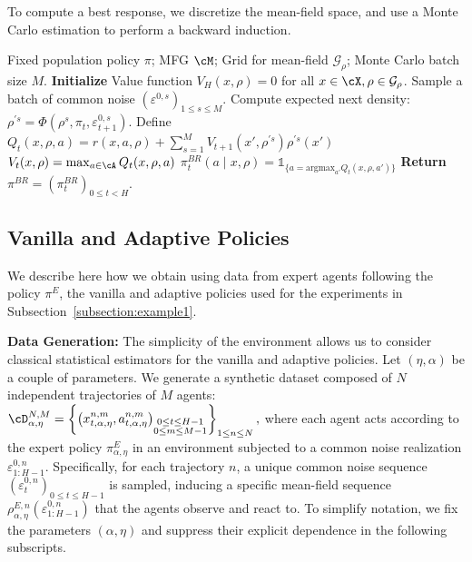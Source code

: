 \documentclass{article}
\theoremstyle{plain}
\begin{document}
To compute a best response, we discretize the mean-field space, and use a Monte Carlo estimation to perform a backward induction. 

\begin{algorithm}[ht]
\caption{Backward Induction for Best Response.}
\begin{algorithmic}[1]
\label{algo:best_response_dp}
\REQUIRE Fixed population policy $\pi$; MFG $\cM$; Grid for mean-field $\mathcal{G}_{\rho}$; Monte Carlo batch size $M$.
\STATE \textbf{Initialize} Value function $V_H(x, \rho) = 0$ for all $x \in \cX, \rho \in \mathcal{G}_{\rho}$.
                \STATE Sample a batch of common noise $(\varepsilon^{0, s})_{1\leq s\leq M}$.
                    \STATE Compute expected next density: $\rho^{'s} = \Phi(\rho^s, \pi_t, \varepsilon^{0,s}_{t+1})$.
                \ENDFOR
                \STATE Define $Q_t(x, \rho, a) = r(x, a, \rho) + \sum_{s = 1}^M  V_{t+1}(x', \rho^{'s})\rho^{'s}(x')$
            \ENDFOR
            \STATE $V_t(x, \rho) = \max_{a \in \cA} Q_t(x, \rho, a)$
            \STATE $\pi^{BR}_t(a \mid x, \rho) = \mathds{1}_{\{a = \text{argmax}_{a'} Q_t(x, \rho, a')\}}$
        \ENDFOR
    \ENDFOR
\ENDFOR
\STATE \textbf{Return} $\pi^{BR} = (\pi^{BR}_t)_{0 \leq t < H}$.
\end{algorithmic}
\end{algorithm}

\subsection{Vanilla and Adaptive Policies}

We describe here how we obtain using data from expert agents following the policy $\pi^E$, the vanilla and adaptive policies used for the experiments in Subsection~\ref{subsection:example1}.

\noindent\textbf{Data Generation:}
The simplicity of the environment allows us to consider classical statistical estimators for the vanilla and adaptive policies. Let $(\eta, \alpha)$ be a couple of parameters. We generate a synthetic dataset composed of $N$ independent trajectories of $M$ agents:
$
\cD_{\alpha,\eta}^{N, M} = \left\{ \left( x^{n,m}_{t, \alpha, \eta}, a^{n,m}_{t, \alpha, \eta} \right)_{\substack{0\leq t\leq H-1 \\ 0\leq m \leq M-1}} \right\}_{1\leq n\leq N},
$
where each agent acts according to the expert policy $\pi^E_{\alpha, \eta}$ in an environment subjected to a common noise realization $\varepsilon^{0,n}_{1:H-1}$. Specifically, for each trajectory $n$, a unique common noise sequence $(\varepsilon^{0,n}_{t})_{0 \leq t \leq H-1}$ is sampled, inducing a specific mean-field sequence $\rho^{E,n}_{\alpha, \eta}(\varepsilon^{0,n}_{1:H-1})$ that the agents observe and react to. To simplify notation, we fix the parameters $(\alpha, \eta)$ and suppress their explicit dependence in the following subscripts.
\end{document}
